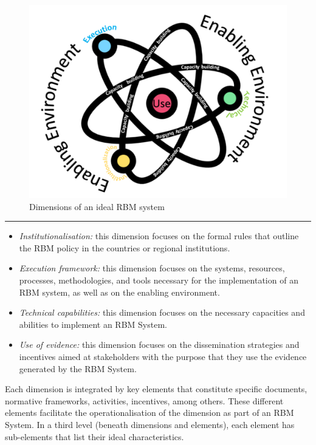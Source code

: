 \documentclass[
  10pt,
]{book}
\begin{document}
\begin{figure}

{\centering \includegraphics[width=1\linewidth]{./images/figure_2} 

}

\caption{Dimensions of an ideal RBM system}\label{fig:figure2}
\end{figure}

\begin{center}\rule{0.5\linewidth}{0.5pt}\end{center}

\begin{itemize}
\item
  \emph{Institutionalisation:} this dimension focuses on the formal rules that outline the RBM policy in the countries or regional institutions.
\item
  \emph{Execution framework:} this dimension focuses on the systems, resources, processes, methodologies, and tools necessary for the implementation of an RBM system, as well as on the enabling environment.
\item
  \emph{Technical capabilities:} this dimension focuses on the necessary capacities and abilities to implement an RBM System.
\item
  \emph{Use of evidence:} this dimension focuses on the dissemination strategies and incentives aimed at stakeholders with the purpose that they use the evidence generated by the RBM System.
\end{itemize}

Each dimension is integrated by key elements that constitute specific documents, normative frameworks, activities, incentives, among others. These different elements facilitate the operationalisation of the dimension as part of an RBM System. In a third level (beneath dimensions and elements), each element has sub-elements that list their ideal characteristics.
\end{document}
